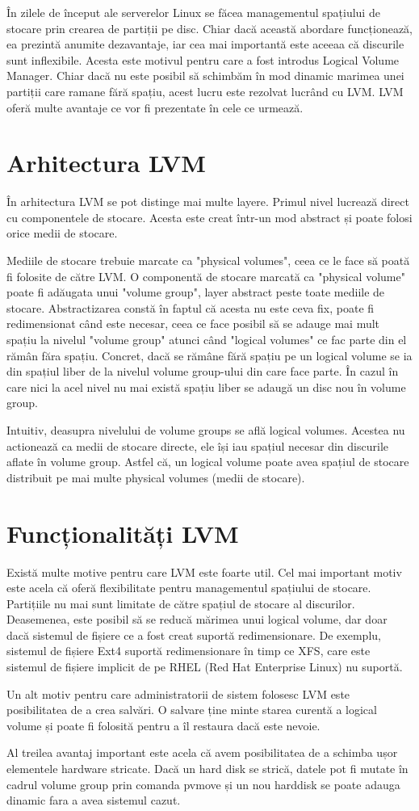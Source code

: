 În zilele de început ale serverelor Linux se făcea managementul spațiului de stocare prin crearea de partiții pe disc. Chiar dacă această abordare funcționează, ea prezintă anumite dezavantaje, iar cea mai importantă este aceeaa că discurile sunt inflexibile. Acesta este motivul pentru care a fost introdus Logical Volume Manager. Chiar dacă nu este posibil să schimbăm în mod dinamic marimea unei partiții care ramane fără spațiu, acest lucru este rezolvat lucrând cu LVM. LVM oferă multe avantaje ce vor fi prezentate în cele ce urmează.
\section{Arhitectura LVM}
În arhitectura LVM se pot distinge mai multe layere. Primul nivel lucrează direct cu componentele de stocare. Acesta este creat într-un mod abstract și poate folosi orice medii de stocare.
\par
Mediile de stocare trebuie marcate ca "physical volumes", ceea ce le face să poată fi folosite de către LVM. O componentă de stocare marcată ca "physical volume" poate fi adăugata unui "volume group", layer abstract peste toate mediile de stocare. Abstractizarea constă în faptul că acesta nu este ceva fix, poate fi redimensionat când este necesar, ceea ce face posibil să se adauge mai mult spațiu la nivelul "volume group" atunci când "logical volumes" ce fac parte din el rămân făra spațiu. Concret, dacă se rămâne fără spațiu pe un logical volume se ia din spațiul liber de la nivelul volume group-ului din care face parte. În cazul în care nici la acel nivel nu mai există spațiu liber se adaugă un disc nou în volume group. 
\par
Intuitiv, deasupra nivelului de volume groups se află logical volumes. Acestea nu actionează ca medii de stocare directe, ele își iau spațiul necesar din discurile aflate în volume group. Astfel că, un logical volume poate avea spațiul de stocare distribuit pe mai multe physical volumes (medii de stocare).
\section{Funcționalități LVM}
Există multe motive pentru care LVM este foarte util. Cel mai important motiv este acela că oferă flexibilitate pentru managementul spațiului de stocare. Partițiile nu mai sunt limitate de către spațiul de stocare al discurilor. Deasemenea, este posibil să se reducă mărimea unui logical volume, dar doar dacă sistemul de fișiere ce a fost creat suportă redimensionare. De exemplu, sistemul de fișiere Ext4 suportă redimensionare în timp ce XFS, care este sistemul de fișiere implicit de pe RHEL (Red Hat Enterprise Linux) nu suportă.
\par
Un alt motiv pentru care administratorii de sistem folosesc LVM este posibilitatea de a crea salvări. O salvare ține minte starea curentă a logical volume și poate fi folosită pentru a îl restaura dacă este nevoie.
\par
Al treilea avantaj important este acela că avem posibilitatea de a schimba ușor elementele hardware stricate. Dacă un hard disk se strică, datele pot fi mutate în cadrul volume group prin comanda pvmove și un nou harddisk se poate adauga dinamic fara a avea sistemul cazut.
